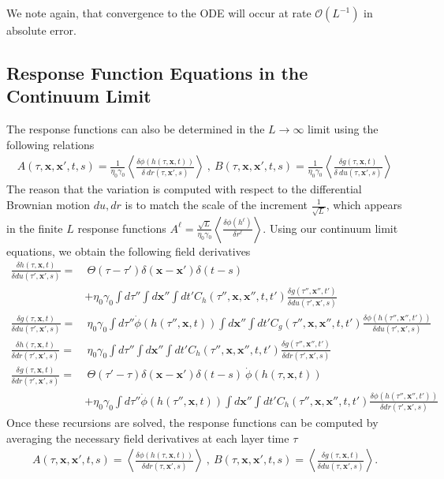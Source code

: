 \documentclass{article} %
\def\x{\bm x}
\begin{document}
We note again, that convergence to the ODE will occur at rate $\mathcal{O}(L^{-1})$ in absolute error. 

\subsection{Response Function Equations in the Continuum Limit}

The response functions can also be determined in the $L \to \infty$ limit using the following relations
\begin{align}
    A(\tau,\x,\x',t,s) = \frac{1}{\eta_0\gamma_0} \left< \frac{\delta \phi(h(\tau,\x,t))}{\delta \ dr(\tau,\x',s)} \right> \ , \ B(\tau,\x,\x',t,s) = \frac{1}{\eta_0\gamma_0} \left< \frac{\delta g(\tau,\x,t)}{\delta \ du(\tau,\x',s)} \right>
\end{align}
The reason that the variation is computed with respect to the differential Brownian motion $du, dr$ is to match the scale of the increment $\frac{1}{\sqrt L}$, which appears in the finite $L$ response functions $A^\ell = \frac{\sqrt{L}}{\eta_0 \gamma_0} \left< \frac{\delta \phi(h^\ell) }{\delta r^\ell} \right>$. Using our continuum limit equations, we obtain the following field derivatives
\begin{align}
    \frac{\delta h(\tau,\x,t)}{\delta  du(\tau',\x',s)} =& \ 
 \Theta(\tau-\tau') \delta(\x-\x') \delta(t-s) \nonumber
    \\
    &+\eta_0 \gamma_0 \int d\tau'' \int d\x'' \int dt' C_h(\tau'',\x,\x'',t,t') \frac{\delta g(\tau'',\x'',t')}{\delta du(\tau',\x',s) } \nonumber
    \\
    \frac{\delta g(\tau,\x,t)}{\delta  du(\tau',\x',s)} =&  \ \eta_0 \gamma_0 \int d\tau'' \dot\phi(h(\tau'',\x,t)) \int d\x'' \int dt' C_g(\tau'',\x,\x'',t,t') \frac{\delta \phi(h(\tau'',\x'',t'))}{\delta du(\tau',\x',s) } \nonumber
    \\
    \frac{\delta h(\tau,\x,t)}{\delta  dr(\tau',\x',s)} =&  \ \eta_0 \gamma_0 \int d\tau'' \int d\x'' \int dt' C_h(\tau'',\x,\x'',t,t') \frac{\delta g(\tau'',\x'',t')}{\delta dr(\tau',\x',s) } \nonumber
    \\
    \frac{\delta g(\tau,\x,t)}{\delta  dr(\tau',\x',s)} =& \ \Theta(\tau'-\tau) \delta(\x-\x') \delta(t-s) \ \dot\phi(h(\tau,\x,t)) \nonumber
    \\
    &+ \eta_0 \gamma_0 \int d\tau'' \dot\phi(h(\tau'',\x,t)) \int d\x'' \int dt' C_h(\tau'',\x,\x'',t,t') \frac{\delta \phi(h(\tau'',\x'',t'))}{\delta dr(\tau',\x',s) }
\end{align}
Once these recursions are solved, the response functions can be computed by averaging the necessary field derivatives at each layer time $\tau$
\begin{align}
    A(\tau,\x,\x',t,s) = \left< \frac{\delta \phi(h(\tau,\x,t))}{\delta dr(\tau,\x',s)} \right> \ , \ B(\tau,\x,\x',t,s) = \left< \frac{\delta g(\tau,\x,t)}{\delta du(\tau,\x',s)} \right> .
\end{align}
\end{document}

